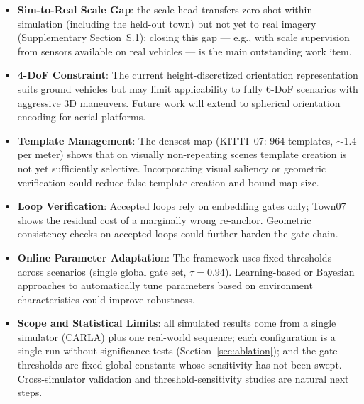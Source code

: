 \begin{itemize}
    \item \textbf{Sim-to-Real Scale Gap}: the scale head transfers zero-shot within simulation (including the held-out town) but not yet to real imagery (Supplementary Section~S.1); closing this gap --- e.g., with scale supervision from sensors available on real vehicles --- is the main outstanding work item.

    \item \textbf{4-DoF Constraint}: The current height-discretized orientation representation suits ground vehicles but may limit applicability to fully 6-DoF scenarios with aggressive 3D maneuvers. Future work will extend to spherical orientation encoding for aerial platforms.

    \item \textbf{Template Man\-age\-ment}: The densest map (KITTI~07: 964 templates, $\sim$1.4 per meter) shows that on visually non-repeating scenes template creation is not yet sufficiently selective. Incorporating visual saliency or geometric verification could reduce false template creation and bound map size.

    \item \textbf{Loop Verification}: Accepted loops rely on embedding gates only; Town07 shows the residual cost of a marginally wrong re-anchor. Geometric consistency checks on accepted loops could further harden the gate chain.

    \item \textbf{Online Parameter Adaptation}: The framework uses fixed thresholds across scenarios (single global gate set, $\tau=0.94$). Learning-based or Bayesian approaches to automatically tune parameters based on environment characteristics could improve robustness.

    \item \textbf{Scope and Statistical Limits}: all simulated results come from a single simulator (CARLA) plus one real-world sequence; each configuration is a single run without significance tests (Section~\ref{sec:ablation}); and the gate thresholds are fixed global constants whose sensitivity has not been swept. Cross-simulator validation and threshold-sensitivity studies are natural next steps.
\end{itemize}
